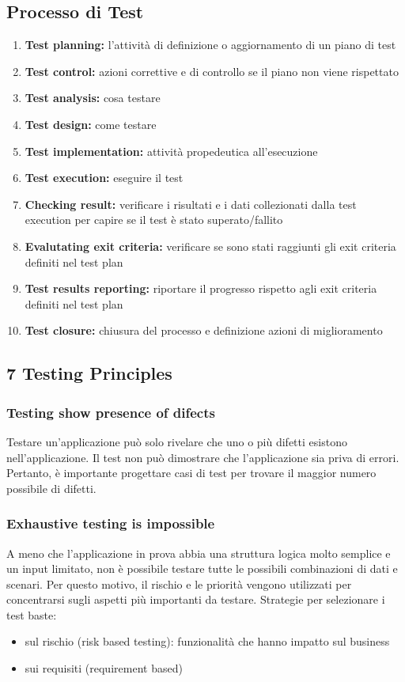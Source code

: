 \subsection{Processo di Test}
\begin{enumerate}
    \item \textbf{Test planning:} l'attività di definizione o aggiornamento di un piano di test
    \item \textbf{Test control:} azioni correttive e di controllo se il piano non viene rispettato
    \item \textbf{Test analysis:} cosa testare
    \item \textbf{Test design:} come testare
    \item \textbf{Test implementation:} attività propedeutica all'esecuzione
    \item \textbf{Test execution:} eseguire il test
    \item \textbf{Checking result:} verificare i risultati e i dati collezionati dalla test execution per capire se il test è stato superato/fallito
    \item \textbf{Evalutating exit criteria:} verificare se sono stati raggiunti gli exit criteria definiti nel test plan
    \item \textbf{Test results reporting:} riportare il progresso rispetto agli exit criteria definiti nel test plan
    \item \textbf{Test closure:} chiusura del processo e definizione azioni di miglioramento
\end{enumerate}

\subsection{7 Testing Principles}

\subsubsection{Testing show presence of difects}
Testare un'applicazione può solo rivelare che uno o più difetti esistono nell'applicazione.
Il test non può dimostrare che l'applicazione sia priva di errori.
Pertanto, è importante progettare casi di test per trovare il maggior numero possibile di difetti.

\subsubsection{Exhaustive testing is impossible}
A meno che l'applicazione in prova abbia una struttura logica molto semplice e un input limitato, non è possibile testare tutte le possibili combinazioni di dati e scenari.
Per questo motivo, il rischio e le priorità vengono utilizzati per concentrarsi sugli aspetti più importanti da testare.
Strategie per selezionare i test baste:
\begin{itemize}
    \item sul rischio (risk based testing): funzionalità che hanno impatto sul business
    \item sui requisiti (requirement based)
\end{itemize}

